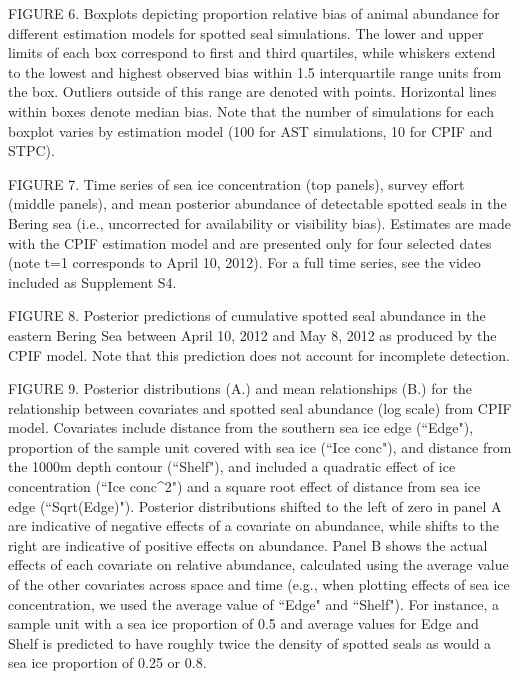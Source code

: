 \documentclass[12pt,english]{article}
\begin{document}
\begin{spacing}{1.9}
FIGURE 6. Boxplots depicting proportion relative bias of animal abundance for different estimation models for spotted seal simulations.  The lower and upper limits of each box correspond to first and third quartiles, while whiskers extend to the lowest and highest observed bias within 1.5 interquartile range units from the box.  Outliers outside of this range are denoted with points.  Horizontal lines within boxes denote median bias.  Note that the number of simulations for each boxplot varies by estimation model (100 for AST simulations, 10 for CPIF and STPC).

FIGURE 7. Time series of sea ice concentration (top panels), survey effort (middle panels), and mean posterior abundance of detectable spotted seals in the Bering sea (i.e., uncorrected for availability or visibility bias).  Estimates are made with the CPIF estimation model and are presented only for four selected dates (note t=1 corresponds to April 10, 2012).  For a full time series, see the video included as Supplement S4.

FIGURE 8. Posterior predictions of cumulative spotted seal abundance in the eastern Bering Sea between April 10, 2012 and May 8, 2012 as produced by the CPIF model.  Note that this prediction does not account for incomplete detection.

FIGURE 9. Posterior distributions (A.) and mean relationships (B.) for the relationship between covariates and spotted seal abundance (log scale) from CPIF model.  Covariates include distance from the southern sea ice edge (``Edge"), proportion of the sample unit covered with sea ice (``Ice conc"), and distance from the 1000m depth contour (``Shelf"), and included a quadratic effect of ice concentration (``Ice conc\string^2") and a square root effect of distance from sea ice edge (``Sqrt(Edge)"). Posterior distributions shifted to the left of zero in panel A are indicative of negative effects of a covariate on abundance, while shifts to the right are indicative of positive effects on abundance.  Panel B shows the actual effects of each covariate on relative abundance, calculated using the average value of the other covariates across space and time (e.g., when plotting effects of sea ice concentration, we used the average value of ``Edge" and ``Shelf").  For instance, a sample unit with a sea ice proportion of 0.5 and average values for Edge and Shelf is predicted to have roughly twice the density of spotted seals as would a sea ice proportion of 0.25 or 0.8.


\pagebreak


\end{spacing}
\end{document}
